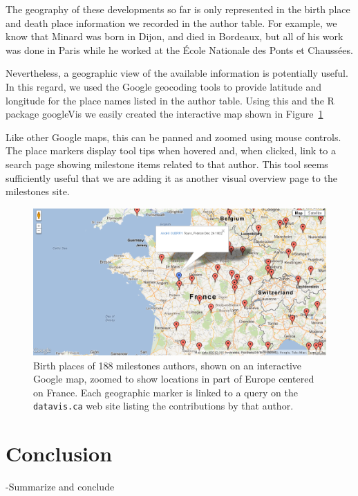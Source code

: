 \documentclass[11pt]{article}
\newcommand*{\figref}[1]{Figure~\ref{#1}}
\begin{document}
The geography of these developments so far is only represented in the birth place
and death place information we recorded in the author table.
For example, we know that Minard was born in Dijon, and died in Bordeaux, but
all of his work was done in Paris while he worked at the
{\'E}cole Nationale des Ponts et Chauss{\'e}es.

Nevertheless, a geographic view of the available information is potentially useful.
In this regard, we used the Google geocoding tools to provide latitude and
longitude for the place names listed in the author table.  Using this and the
R package googleVis \citep{googleVis} we easily created the interactive map shown
in \figref{fig:authormap}

Like other Google maps, this can be panned and zoomed using mouse controls.
The place markers display tool tips when hovered and, when clicked, link to
a search page showing milestone items related to that author.
This tool seems sufficiently useful that we are adding it as another visual
overview page to the milestones site.


\begin{figure}[!htb]
  \centering
  \includegraphics[width=\textwidth,clip]{fig/authormap}
  \caption{Birth places of 188 milestones authors, shown on an interactive Google map, zoomed to show locations
  in part of Europe centered on France. Each geographic marker is linked to a query on
  the \texttt{datavis.ca} web site listing the contributions by that author.
  }
  \label{fig:authormap}
\end{figure}



\section{Conclusion}
-Summarize and conclude


\end{document}
